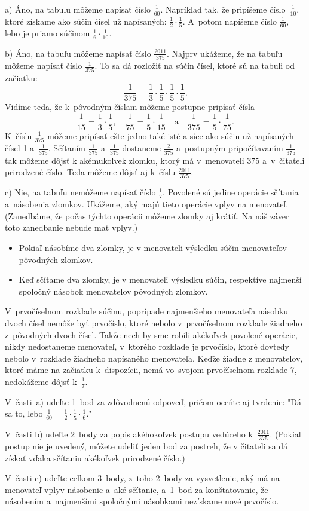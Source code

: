 {%
a) Áno, na tabuľu môžeme napísať číslo $\frac{1}{60}$.
Napríklad tak, že pripíšeme číslo~$\frac{1}{10}$, ktoré získame ako súčin
čísel už napísaných: $\frac{1}{2}\cdot\frac{1}{5}$.
A~potom napíšeme číslo $\frac{1}{60}$, lebo je priamo súčinom
$\frac{1}{6}\cdot\frac{1}{10}$.

\smallskip
b) Áno, na tabuľu môžeme napísať číslo $\frac{2011}{375}$.
Najprv ukážeme, že na tabuľu môžeme napísať číslo $\frac{1}{375}$.
To sa dá rozložiť na súčin čísel, ktoré sú na tabuli od začiatku:
$$
\frac{1}{375} = \frac{1}{3}\cdot\frac{1}{5}\cdot\frac{1}{5}\cdot\frac{1}{5}.
$$
Vidíme teda, že k~pôvodným číslam môžeme postupne pripísať čísla
$$
\frac{1}{15} = \frac{1}{3}\cdot\frac{1}{5},\quad \frac{1}{75} = \frac{1}{5}\cdot\frac{1}{15}\quad\text{a}\quad
\frac{1}{375} = \frac{1}{5}\cdot\frac{1}{75}.
$$
K~číslu $\frac{1}{375}$ môžeme pripísať ešte jedno také isté a síce ako
súčin už napísaných čísel 1 a~$\frac{1}{375}$.
Sčítaním $\frac{1}{375}$ a~$\frac{1}{375}$ dostaneme
$\frac{2}{375}$ a~postupným pripočítavaním $\frac{1}{375}$ tak môžeme dôjsť k akémukoľvek zlomku, ktorý má v~menovateli $375$ a~v~čitateli prirodzené číslo.
Teda môžeme dôjsť aj k~číslu $\frac{2011}{375}$.

\smallskip
c) Nie, na tabuľu nemôžeme napísať číslo $\frac{1}{7}$.
Povolené sú jedine operácie sčítania a~násobenia zlomkov. Ukážeme, aký majú
tieto operácie vplyv na menovateľ.
(Zanedbáme, že počas týchto operácii môžeme zlomky aj krátiť. Na náš záver
toto zanedbanie nebude mať vplyv.)
\begin{itemize}
  \item Pokiaľ násobíme dva zlomky, je v menovateli výsledku súčin
    menovateľov pôvodných zlomkov.
  \item Keď sčítame dva zlomky, je v menovateli výsledku súčin,
    respektíve najmenší spoločný násobok menovateľov pôvodných zlomkov.
\end{itemize}
V~prvočíselnom rozklade súčinu, poprípade najmenšieho menovateľa násobku dvoch čísel
nemôže byť prvočíslo, ktoré nebolo v~prvočíselnom rozklade
žiadneho z~pôvodných dvoch čísel.
Takže nech by sme robili akékoľvek povolené operácie, nikdy nedostaneme menovateľ,
v~ktorého rozklade je prvočíslo, ktoré dovtedy nebolo v~rozklade žiadneho
napísaného menovateľa.
Keďže žiadne z menovateľov, ktoré máme na začiatku k~dispozícii, nemá vo~svojom prvočíselnom
rozklade 7, nedokážeme dôjsť k~$\frac{1}{7}$.

\hodnotenie
V~časti~a) udeľte 1~bod za zdôvodnenú odpoveď, pričom oceňte aj tvrdenie:
"Dá sa to, lebo $\frac{1}{60} = \frac{1}{2}\cdot\frac{1}{5}\cdot\frac{1}{6}$."

V~časti b) udeľte 2~body za popis akéhokoľvek postupu vedúceho k~$\frac{2011}{375}$.
(Pokiaľ postup nie je uvedený, môžete udeliť jeden bod za postreh, že v čitateli sa dá získať vďaka sčítaniu akékoľvek prirodzené číslo.)

V~časti c) udeľte celkom 3~body, z~toho 2~body za vysvetlenie, aký má na
menovateľ vplyv násobenie a~aké sčítanie, a~1~bod za konštatovanie, že
násobením a~najmenšími spoločnými násobkami nezískame nové prvočíslo.
\endhodnotenie
}

